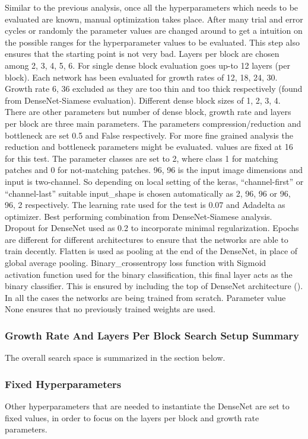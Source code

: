 Similar to the previous analysis, once all the hyperparameters which needs to be evaluated are known, manual optimization takes place. 
After many trial and error cycles or randomly the parameter values are changed around to get a intuition on the possible ranges for the hyperparameter values to be evaluated. This step also ensures that the starting point is not very bad.
Layers per block are chosen among 2, 3, 4, 5, 6. For single dense block evaluation goes up-to 12 layers (per block). 
Each network has been evaluated for growth rates of 12, 18, 24, 30. Growth rate 6, 36 excluded as they are too thin and too thick respectively (found from DenseNet-Siamese evaluation). Different dense block sizes of 1, 2, 3, 4. 
There are other parameters but number of dense block, growth rate and layers per block are three main parameters. The parameters compression/reduction and bottleneck are set 0.5 and False respectively. 
For more fine grained analysis the reduction and bottleneck parameters might be evaluated.  values are fixed at 16 for this test. The parameter classes are set to 2, where class 1 for matching patches and 0 
for not-matching patches. 96, 96 is the input image dimensions and input is two-channel. So depending on local setting of the keras, “channel-first” or “channel-last” suitable input\_shape is 
chosen automatically as 2, 96, 96 or 96, 96, 2 respectively. The learning rate used for the test is 0.07 and Adadelta as optimizer. Best performing combination from DenseNet-Siamese analysis. 
Dropout for DenseNet used as 0.2 to incorporate minimal regularization. Epochs are different for different architectures to ensure that the networks are able to train decently. 
Flatten is used as pooling at the end of the DenseNet, in place of global average pooling. Binary\_crossentropy loss function with Sigmoid activation function used for the binary classification, this final layer acts as the binary classifier.
This is ensured by including the top of DenseNet architecture (). In all the cases the networks are being trained from scratch. Parameter  value None ensures that no previously trained weights are used.

\subsubsection{Growth Rate And Layers Per Block Search Setup Summary}
The overall search space is summarized in the section below.
\subsubsection{Fixed Hyperparameters}
\label{fixed_params}
Other hyperparameters that are needed to instantiate the DenseNet are set to fixed values, in order to focus on the layers per block and growth rate parameters.


